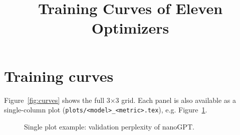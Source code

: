 \documentclass[10pt,twocolumn]{article}
\title{Training Curves of Eleven Optimizers}
\author{}\date{}
\newcommand{\curvesroot}{.}
\begin{document}
\maketitle
\section{Training curves}
Figure~\ref{fig:curves} shows the full 3$\times$3 grid. Each panel is also available as a single-column plot
(\texttt{plots/<model>\_<metric>.tex}), e.g. Figure~\ref{fig:single}.



\begin{figure}[t]
  \centering
  
  \caption{Single plot example: validation perplexity of nanoGPT.}
  \label{fig:single}
\end{figure}
\end{document}
